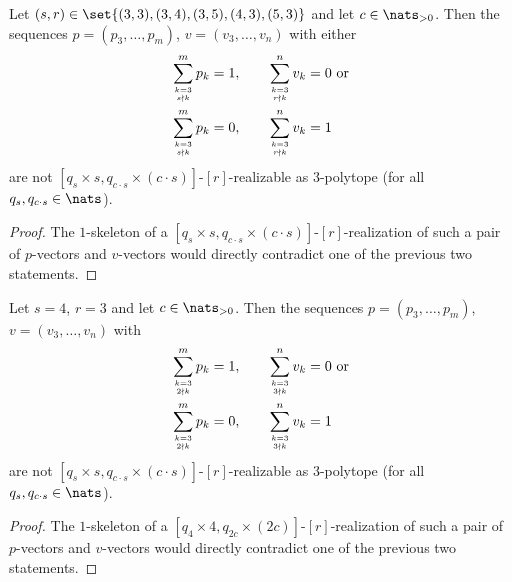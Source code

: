 \begin{corollary}\label{thm:division:nonrealizable}
  Let $(s, r) \in \set{(3, 3), (3, 4), (3, 5), (4, 3), (5, 3)}$ and let $c \in \nats_{> 0}$. Then the sequences $p = (p_3, \dots, p_m)$, $v = (v_3, \dots, v_n)$ with either
  \begin{align*}
    \sum_{k = 3 \atop s \nmid k}^m p_k = 1, \qquad&\sum_{k = 3 \atop r \nmid k}^n v_k = 0 \text{~or} \\
    \sum_{k = 3 \atop s \nmid k}^m p_k = 0, \qquad&\sum_{k = 3 \atop r \nmid k}^n v_k = 1
  \end{align*}
  are not $[q_s \times s, q_{c \cdot s} \times (c \cdot s)]$-$[r]$-realizable as $3$-polytope (for all $q_s, q_{c \cdot s} \in \nats$).
\begin{proof}
  The $1$-skeleton of a $[q_s \times s, q_{c \cdot s} \times (c \cdot s)]$-$[r]$-realization of such a pair of $p$-vectors and $v$-vectors would directly contradict one of the previous two statements.
\end{proof}
\end{corollary}

\begin{corollary}\label{thm:division:nonrealizable2}
  Let $s=4$, $r=3$ and let $c \in \nats_{> 0}$. Then the sequences $p = (p_3, \dots, p_m)$, $v = (v_3, \dots, v_n)$ with
  \begin{align*}
    \sum_{k = 3 \atop 2 \nmid k}^m p_k = 1, \qquad&\sum_{k = 3 \atop 3 \nmid k}^n v_k = 0 \text{~or} \\
    \sum_{k = 3 \atop 2 \nmid k}^m p_k = 0, \qquad&\sum_{k = 3 \atop 3 \nmid k}^n v_k = 1
  \end{align*}
  are not $[q_s \times s, q_{c \cdot s} \times (c \cdot s)]$-$[r]$-realizable as $3$-polytope (for all $q_s, q_{c \cdot s} \in \nats$).
\begin{proof}
  The $1$-skeleton of a $[q_4 \times 4, q_{2c} \times (2c)]$-$[r]$-realization of such a pair of $p$-vectors and $v$-vectors would directly contradict one of the previous two statements.
\end{proof}
\end{corollary}


